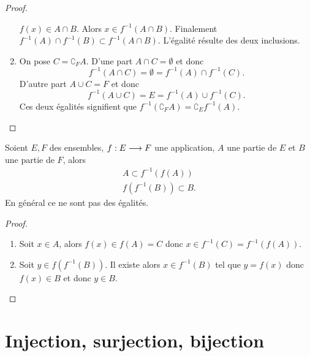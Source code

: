 \begin{proof}
\begin{enumerate}
            \(f(x) \in A \cap B\). Alors \(x \in f^{-1}(A \cap B)\). Finalement 
            \(f^{-1}(A) \cap f^{-1}(B) \subset f^{-1}(A \cap B)\). L'égalité 
            résulte des deux inclusions.
        \item On pose \(C=\complement_F A\). D'une part \(A \cap C =\emptyset\) 
            et donc
            \begin{equation}
                f^{-1}(A \cap C)=\emptyset=f^{-1}(A) \cap f^{-1}(C).
            \end{equation}
            D'autre part \(A \cup C =F\) et donc
            \begin{equation}
                f^{-1}(A \cup C) = E = f^{-1}(A) \cup f^{-1}(C).
            \end{equation}
            Ces deux égalités signifient que \(f^{-1}(\complement_F A) = 
            \complement_E f^{-1}(A)\). 
    \end{enumerate}
\end{proof}
\begin{prop}
    Soient \(E,F\) des ensembles, \(f:E \longrightarrow F\) une application, \(A\) 
    une partie de \(E\) et \(B\) une partie de \(F\), alors
    \begin{gather}
        A \subset f^{-1}(f(A)) \\
        f(f^{-1}(B)) \subset B.
    \end{gather}
    En général ce ne sont pas des égalités.
\end{prop}
\begin{proof}
    \begin{enumerate}
        \item Soit \(x \in A\), alors \(f(x) \in f(A) = C\) donc \(x \in 
            f^{-1}(C)=f^{-1}(f(A))\).
        \item Soit \(y \in f(f^{-1}(B))\). Il existe alors \(x \in f^{-1}(B)\) 
            tel que \(y=f(x)\) donc \(f(x) \in B\) et donc \(y \in B\).
    \end{enumerate}
\end{proof}
\section{Injection, surjection, bijection}
\label{chap3-sec:injsurbij}
